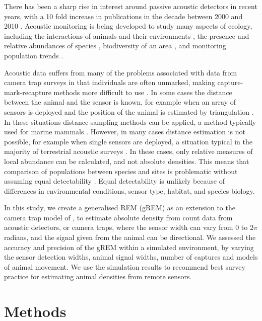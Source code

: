 \documentclass[a4paper,10pt,reqno,oneside]{amsart}
\begin{document}
There has been a sharp rise in interest around passive acoustic detectors in recent years, with a 10 fold increase in publications in the decade between 2000 and 2010 \citep{kessel2014review}. Acoustic monitoring is being developed to study many aspects of ecology, including the interactions of animals and their environments \citep{blumstein2011acoustic, rogers2013density}, the presence and relative abundances of species \citep{marcoux2011local}, biodiversity of an area \citep{depraetere2012monitoring}, and monitoring population trends \citep{walters2013challenges}. 

Acoustic data suffers from many of the problems associated with data from camera trap surveys in that individuals are often unmarked, making capture-mark-recapture methods more difficult to use \citep{marques2013estimating}. In some cases the distance between the animal and the sensor is known, for example when an array of sensors is deployed and the position of the animal is estimated by triangulation \citep{lewis2007sperm}. In these situations distance-sampling methods can be applied, a method typically used for marine mammals \citep{rogers2013density}. However, in many cases distance estimation is not possible, for example when single sensors are deployed, a situation typical in the majority of terrestrial acoustic surveys  \citep{elphick2008you, buckland2008estimating}. In these cases, only relative measures of local abundance can be calculated, and not absolute densities. This means that comparison of populations between species and sites is problematic without assuming equal detectability \citep{hayes2000assumptions, schmidt2003count, walters2013challenges}. Equal detectability is unlikely because of differences in environmental conditions, sensor type, habitat, and species biology. 

In this study, we create a generalised REM (gREM) as an extension to the camera trap model of \citet{rowcliffe2008estimating}, to estimate absolute density from count data from acoustic detectors, or camera traps, where the sensor width can vary from 0 to $2\pi$ radians, and the signal given from the animal can be directional. We assessed the accuracy and precision of the gREM within a simulated environment, by varying the sensor detection widths, animal signal widths, number of captures and models of animal movement. We use the simulation results to recommend best survey practice for estimating animal densities from remote sensors. 

\section*{Methods}
\end{document}
